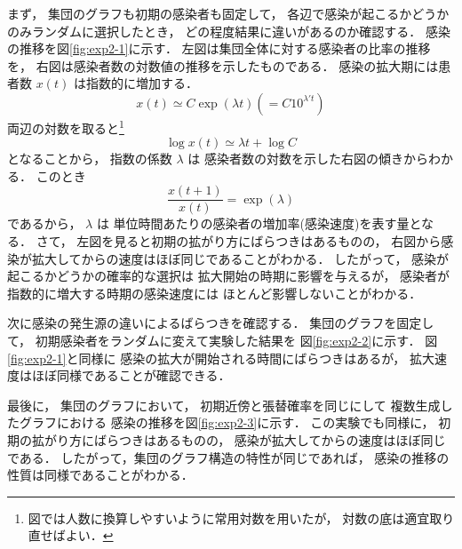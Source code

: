 \documentclass[10pt,oneside]{scrartcl}
\begin{document}
まず，
集団のグラフも初期の感染者も固定して，
各辺で感染が起こるかどうかのみランダムに選択したとき，
どの程度結果に違いがあるのか確認する．
感染の推移を図\ref{fig:exp2-1}に示す．
左図は集団全体に対する感染者の比率の推移を，
右図は感染者数の対数値の推移を示したものである．
感染の拡大期には患者数 \(x(t)\) は指数的に増加する．
\begin{equation}
  x(t)\simeq C\exp(\lambda t)
  (=C 10^{\lambda' t})
\end{equation}
両辺の対数を取ると\footnote{図では人数に換算しやすいように常用対数を用いたが，
対数の底は適宜取り直せばよい．}
\begin{equation}
  \log x(t) \simeq \lambda t + \log C
\end{equation}
となることから，
指数の係数 \(\lambda\) は
感染者数の対数を示した右図の傾きからわかる．
このとき
\begin{equation}
  \frac{x(t+1)}{x(t)}
  =\exp(\lambda)
\end{equation}
であるから，
\(\lambda\) は
単位時間あたりの感染者の増加率(感染速度)を表す量となる．
さて，
左図を見ると初期の拡がり方にばらつきはあるものの，
右図から感染が拡大してからの速度はほぼ同じであることがわかる．
したがって，
感染が起こるかどうかの確率的な選択は
拡大開始の時期に影響を与えるが，
感染者が指数的に増大する時期の感染速度には
ほとんど影響しないことがわかる．

\begin{figure*}%
  \centering
\end{figure*}

次に感染の発生源の違いによるばらつきを確認する．
集団のグラフを固定して，
初期感染者をランダムに変えて実験した結果を
図\ref{fig:exp2-2}に示す．
図\ref{fig:exp2-1}と同様に
感染の拡大が開始される時間にばらつきはあるが，
拡大速度はほぼ同様であることが確認できる．

\begin{figure*}%
  \centering
\end{figure*}

最後に，
集団のグラフにおいて，
初期近傍と張替確率を同じにして
複数生成したグラフにおける
感染の推移を図\ref{fig:exp2-3}に示す．
この実験でも同様に，
初期の拡がり方にばらつきはあるものの，
感染が拡大してからの速度はほぼ同じである．
したがって，集団のグラフ構造の特性が同じであれば，
感染の推移の性質は同様であることがわかる．
\end{document}
